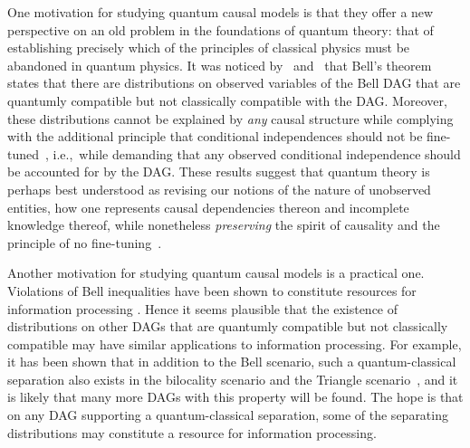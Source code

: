 {One motivation for studying quantum causal models is that they offer a new perspective on an old  problem in the foundations of quantum theory: that of establishing precisely which of the principles of classical physics must be abandoned in quantum physics. It was noticed by~\citet{fritz2012bell} and~\citet{WoodSpekkens} that Bell's theorem~\cite{bell1966lhvm} states that there are distributions on observed variables of the Bell DAG that are quantumly compatible but not classically compatible with the DAG. Moreover, these distributions cannot be explained by \emph{any} causal structure while complying with the additional principle that conditional independences should not be fine-tuned~\cite{WoodSpekkens}, i.e.,~while demanding that any observed conditional independence should be accounted for by the DAG. These results suggest that quantum theory is perhaps best understood as revising our notions of the nature of unobserved entities, how one represents causal dependencies thereon and incomplete knowledge thereof, while 
nonetheless {\em preserving} the spirit of causality and the principle of no fine-tuning~\cite{leifer2013conditionalstates,Spekkens2015paradigm,henson2011ontic}.

Another motivation for studying quantum causal models is a practical one.  Violations of Bell inequalities have  been shown to constitute resources for information processing \cite{NoSigPolytope,scarani2012device,BancalDIApproach}. Hence it seems plausible that the existence of distributions on other DAGs that are quantumly compatible but not classically compatible may have similar applications to information processing. 
For example, it has been shown that in addition to the Bell scenario, such a quantum-classical separation also exists 
in the bilocality scenario \cite{BilocalCorrelations} and the Triangle scenario~\cite{fritz2012bell}, and it is likely that many more DAGs with this property will be found.  The hope is that on any DAG supporting a quantum-classical separation, some of the separating distributions may constitute a resource for information processing. 

}
